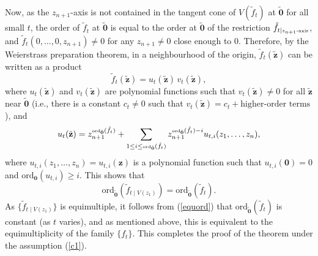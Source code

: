 \documentclass[a4paper,fleqn,11pt]{amsart}
\theoremstyle{definition}
\theoremstyle{remark}
\numberwithin{equation}{section}
\begin{document}
Now, as the $z_{n+1}$-axis is not contained in the tangent cone of $V(\tilde f_t)$ at $\tilde{\mathbf{0}}$ for all small $t$, the order of $\tilde f_t$ at $\tilde{\mathbf{0}}$ is equal to the order at $\tilde{\mathbf{0}}$ of the restriction $\tilde f_{t\mid \mbox{\tiny $z_{n+1}$-axis}}$, and $\tilde f_t(0,\ldots,0,z_{n+1})\not=0$ for any $z_{n+1}\not=0$ close enough to $0$. Therefore, by the Weierstrass preparation theorem, in a neighbourhood of the origin, $\tilde f_t(\tilde{\mathbf{z}})$ can be written as a product
\begin{displaymath}
\tilde f_t(\tilde{\mathbf{z}})=u_t(\tilde{\mathbf{z}})\, v_t(\tilde{\mathbf{z}}),
\end{displaymath} 
where $u_t(\tilde{\mathbf{z}})$ and $v_t(\tilde{\mathbf{z}})$ are polynomial functions such that
$v_t(\tilde{\mathbf{z}})\not=0$ for all $\tilde{\mathbf{z}}$ near $\tilde{\mathbf{0}}$ (i.e., there is a constant $c_t\not=0$ such that $v_t(\tilde{\mathbf{z}})=c_t+\mbox{higher-order terms}$), and 
\begin{displaymath}
u_t(\tilde{\mathbf{z}}) = z_{n+1}^{\mbox{\tiny ord}_{\tilde{\mathbf{0}}}(\tilde f_t)} + \sum_{1\leq i\leq \mbox{\tiny ord}_{\tilde{\mathbf{0}}}(\tilde f_t)}
z_{n+1}^{\mbox{\tiny ord}_{\tilde{\mathbf{0}}}(\tilde f_t)-i} u_{t,i}(z_1,\ldots,z_{n}),
\end{displaymath}
where $u_{t,i}(z_1,\ldots,z_{n})=u_{t,i}(\mathbf{z})$ is a polynomial function such that $u_{t,i}(\mathbf{0})=0$ and $\mbox{ord}_{\mathbf{0}}(u_{t,i})\geq i$. 
This shows that
\begin{equation}\label{equord}
\mbox{ord}_{\tilde{\mathbf{0}}}(\tilde f_{t\mid V(z_1)}) = 
\mbox{ord}_{\tilde{\mathbf{0}}}(\tilde f_t).
\end{equation}
As $\{\tilde f_{t\mid V(z_1)}\}$ is equimultiple, it follows from (\ref{equord}) that $\mbox{ord}_{\tilde{\mathbf{0}}}(\tilde f_t)$ is constant (as $t$ varies), and as mentioned above, this is equivalent to the equimultiplicity of the family $\{f_t\}$. This completes the proof of the theorem under the assumption (\ref{c1}).
\end{document}
